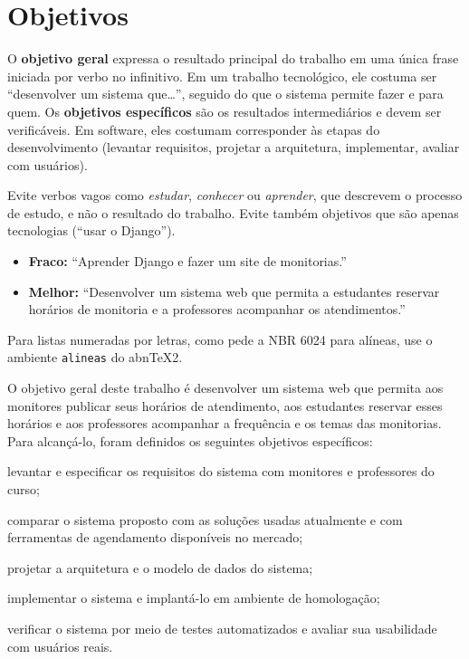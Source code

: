 \section{Objetivos}
\label{sec:introducao:objetivos}

\begin{instrucao}
O \textbf{objetivo geral} expressa o resultado principal do trabalho em uma
única frase iniciada por verbo no infinitivo. Em um trabalho tecnológico, ele
costuma ser ``desenvolver um sistema que\ldots'', seguido do que o sistema
permite fazer e para quem. Os \textbf{objetivos específicos} são os resultados
intermediários e devem ser verificáveis. Em software, eles costumam
corresponder às etapas do desenvolvimento (levantar requisitos, projetar a
arquitetura, implementar, avaliar com usuários).

Evite verbos vagos como \emph{estudar}, \emph{conhecer} ou \emph{aprender},
que descrevem o processo de estudo, e não o resultado do trabalho. Evite também
objetivos que são apenas tecnologias (``usar o Django'').
\begin{itemize}
  \item \textbf{Fraco:} ``Aprender Django e fazer um site de monitorias.''
  \item \textbf{Melhor:} ``Desenvolver um sistema web que permita a estudantes
        reservar horários de monitoria e a professores acompanhar os
        atendimentos.''
\end{itemize}
Para listas numeradas por letras, como pede a NBR 6024 para alíneas, use o
ambiente \verb|alineas| do abnTeX2.
\end{instrucao}

O objetivo geral deste trabalho é desenvolver um sistema web que permita aos
monitores publicar seus horários de atendimento, aos estudantes reservar esses
horários e aos professores acompanhar a frequência e os temas das monitorias.
Para alcançá-lo, foram definidos os seguintes objetivos específicos:
\begin{alineas}
  \item levantar e especificar os requisitos do sistema com monitores e
        professores do curso;
  \item comparar o sistema proposto com as soluções usadas atualmente e com
        ferramentas de agendamento disponíveis no mercado;
  \item projetar a arquitetura e o modelo de dados do sistema;
  \item implementar o sistema e implantá-lo em ambiente de homologação;
  \item verificar o sistema por meio de testes automatizados e avaliar sua
        usabilidade com usuários reais.
\end{alineas}

